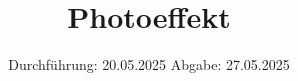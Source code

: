 

\subject{v500}
\title{Photoeffekt}
\date{%
  Durchführung: 20.05.2025
  \hspace{3em}
  Abgabe: 27.05.2025
}



\maketitle
\thispagestyle{empty}
\tableofcontents
\newpage






\printbibliography{}


